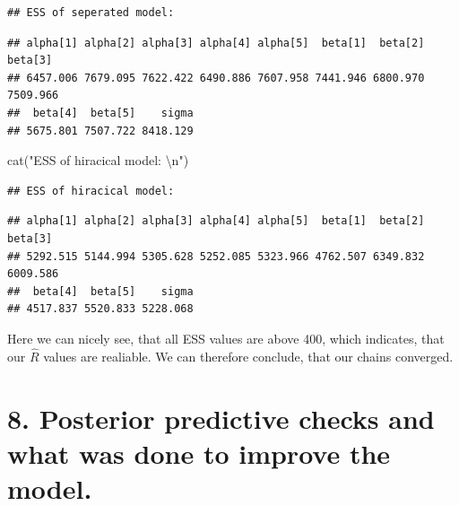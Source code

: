 \documentclass[
]{article}
\newenvironment{Shaded}{\begin{snugshade}}{\end{snugshade}}
\newcommand{\DecValTok}[1]{\textcolor[rgb]{0.00,0.00,0.81}{#1}}
\newcommand{\FunctionTok}[1]{\textcolor[rgb]{0.00,0.00,0.00}{#1}}
\newcommand{\NormalTok}[1]{#1}
\newcommand{\SpecialCharTok}[1]{\textcolor[rgb]{0.00,0.00,0.00}{#1}}
\newcommand{\StringTok}[1]{\textcolor[rgb]{0.31,0.60,0.02}{#1}}
\begin{document}
\begin{verbatim}
## ESS of seperated model:
\end{verbatim}

\begin{Shaded}
\end{Shaded}

\begin{verbatim}
## alpha[1] alpha[2] alpha[3] alpha[4] alpha[5]  beta[1]  beta[2]  beta[3] 
## 6457.006 7679.095 7622.422 6490.886 7607.958 7441.946 6800.970 7509.966 
##  beta[4]  beta[5]    sigma 
## 5675.801 7507.722 8418.129
\end{verbatim}

\begin{Shaded}
\begin{Highlighting}[]
\FunctionTok{cat}\NormalTok{(}\StringTok{"ESS of hiracical model: }\SpecialCharTok{\textbackslash{}n}\StringTok{"}\NormalTok{)}
\end{Highlighting}
\end{Shaded}

\begin{verbatim}
## ESS of hiracical model:
\end{verbatim}

\begin{Shaded}
\end{Shaded}

\begin{verbatim}
## alpha[1] alpha[2] alpha[3] alpha[4] alpha[5]  beta[1]  beta[2]  beta[3] 
## 5292.515 5144.994 5305.628 5252.085 5323.966 4762.507 6349.832 6009.586 
##  beta[4]  beta[5]    sigma 
## 4517.837 5520.833 5228.068
\end{verbatim}

Here we can nicely see, that all ESS values are above 400, which
indicates, that our \(\hat{R}\) values are realiable. We can therefore
conclude, that our chains converged.

\hypertarget{posterior-predictive-checks-and-what-was-done-to-improve-the-model.}{%
\section{8. Posterior predictive checks and what was done to improve the
model.}\label{posterior-predictive-checks-and-what-was-done-to-improve-the-model.}}
\end{document}
